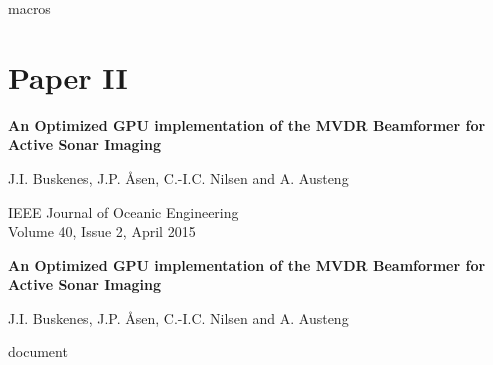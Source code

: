 \newif\ifCLASSOPTIONcompsoc\CLASSOPTIONcompsocfalse

\newif\ifCLASSOPTIONcaptionsoff\CLASSOPTIONcaptionsofffalse

\newcommand\appendices{\textsc{Appendix}}

\newenvironment{IEEEbiography}{}{}

{}
{macros}




\ifMonolithic\else
   
\fi

\ifMonolithic\else\fi

\cleardoublepage
\chapter{Paper II}
\mbox{}\hfill\parbox{.9\linewidth}{\setlength\parskip{\baselineskip}

{\renewcommand\baselinestretch{1.1}
\Large\bf An Optimized GPU implementation of the MVDR Beamformer for Active Sonar Imaging}

J.I. Buskenes, J.P. Åsen, C.-I.C. Nilsen and A. Austeng

IEEE Journal of Oceanic Engineering\\
Volume 40, Issue 2, April 2015
}

\newpage
\pagestyle{empty}

\cleardoublepage
\pagestyle{fancy}
\thispagestyle{plain}

\begin{center}
{\Large\bf An Optimized GPU implementation of the MVDR Beamformer for Active Sonar Imaging}

J.I. Buskenes, J.P. Åsen, C.-I.C. Nilsen and A. Austeng
\end{center}

\newif\ifBS\BSfalse
\ifBS

\fi

\graphicspath{{../HowtoHowtoCapon/final/gfx/}}
{document}


   
% 
% 
%    


\ifMonolithic\else\fi